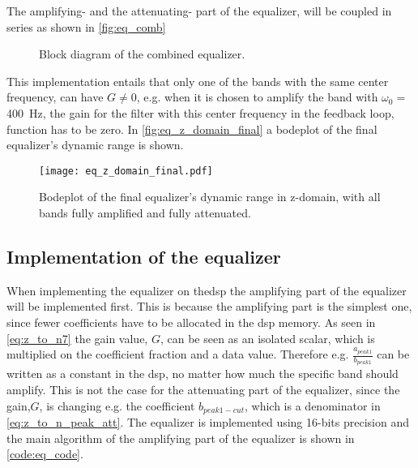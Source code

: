 The amplifying- and the attenuating- part of the equalizer, will be coupled in series as shown in \autoref{fig:eq_comb}

\begin{figure}[!h]
\centering
\def\svgwidth{0.72\columnwidth}
\scalebox{1}{}
\caption{Block diagram of the combined equalizer.}
		\label{fig:eq_comb}
\end{figure}

This implementation entails that only one of the bands with the same center frequency, can have $G \ne 0$, e.g. when it is chosen to amplify the band with $\omega_0 =$ \SI{400}{\hertz}, the gain for the filter with this center frequency in the feedback loop,  function has to be zero. 
In \autoref{fig:eq_z_domain_final} a bodeplot of the final equalizer's dynamic range is shown.

\begin{figure}[!h]
    \centering
        \texttt{[image: eq\_z\_domain\_final.pdf]}
        \caption{Bodeplot of the final equalizer's dynamic range in z-domain, with all bands fully amplified and fully attenuated.}
        \label{fig:eq_z_domain_final}
  \end{figure}
  
\subsection{Implementation of the equalizer}
When implementing the equalizer on the\gls{dsp} the amplifying part of the equalizer will be implemented first. This is because the amplifying part is the simplest one, since fewer coefficients have to be allocated in the \gls{dsp} memory. As seen in \autoref{eq:z_to_n7} the gain value, $G$, can be seen as an isolated scalar, which is multiplied on the coefficient fraction and a data value. Therefore e.g. $\frac{a_{peak1}}{b_{peak1}}$ can be written as a constant in the \gls{dsp}, no matter how much the specific band should amplify. This is not the case for the attenuating part of the equalizer, since the gain,$G$, is changing e.g. the coefficient $b_{peak1-cut}$, which is a denominator in \autoref{eq:z_to_n_peak_att}. 
The equalizer is implemented using 16-bits precision and the main algorithm of the amplifying part of the equalizer is shown in \autoref{code:eq_code}. 


